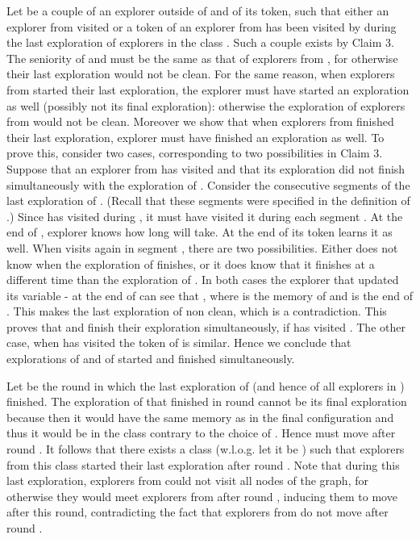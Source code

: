 \documentclass[11pt]{article}
\newcommand{\qed}{\hfill  \bigbreak}
\newenvironment{proof}{\noindent {\bf Proof.}}{\qed}
\begin{document}
\begin{proof}
Let  be a couple of an explorer outside of   and of its token, such that either an explorer from  visited  or a token of an explorer
from  has been visited by  during the last exploration of explorers in the class . Such a couple exists by {Claim 3}. The seniority of  and  must be the same as that of explorers from  ,
for otherwise their last exploration would not be clean. For the same reason, when explorers from  started their last exploration, the explorer  must
have started an exploration as well (possibly not its final exploration):  otherwise the exploration of explorers from  would not be clean. Moreover we show that
 when explorers from  finished their last exploration, explorer  must have finished an exploration as well. To prove this, consider two cases, corresponding
 to two possibilities in {Claim 3}.  Suppose that an explorer  from  has visited  and that its exploration did not finish simultaneously with the exploration
 of . Consider the consecutive segments  of the last exploration  of . (Recall that these segments were specified in the definition of .) Since  has visited  during , it must have visited it during each segment . At the end of , explorer  knows how long
  will take. At the end of  its token learns it as well. When  visits  again in segment , there are two possibilities. 
 Either  does not
 know when the exploration of  finishes, or it does know that it finishes at a different time than the exploration of . In both cases the explorer  that
 updated its variable - at the end of  can see that , where  is the memory of  and  is the end of . 
This makes the last exploration of  non clean, which is a contradiction. This proves that   and  finish their exploration simultaneously, if 
has visited . The other case, when  has visited the token of  is similar. Hence we conclude that explorations of  and of  started
and finished simultaneously.

Let  be the round in which the last exploration of  (and hence of all explorers in ) finished. The exploration of  that finished in round 
cannot be its final exploration because then it would have the same memory as  in the final configuration and thus it would be in the class   
contrary to the choice of . Hence  must move after round . It follows that there exists a class  (w.l.o.g. let it be ) such that explorers 
from this class started their last exploration after round . Note that during this last exploration, explorers from  could not visit all nodes of the graph, for otherwise they would meet explorers from  after round , inducing them to move after this round, contradicting the fact that explorers from 
do not move after round .


\end{proof}
\end{document}
